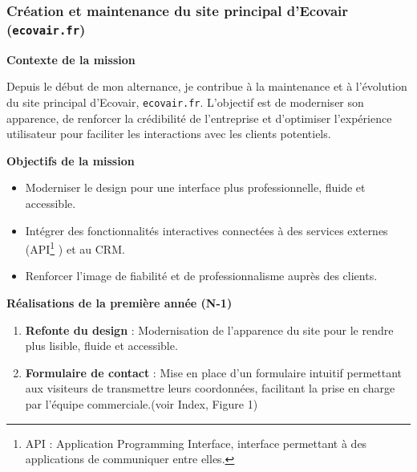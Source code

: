 \subsubsection{Création et maintenance du site principal d’Ecovair (\texttt{ecovair.fr})}

\textbf{Contexte de la mission}\vspace{0.3cm}

Depuis le début de mon alternance, je contribue à la maintenance et à l’évolution du site principal d’Ecovair, \texttt{ecovair.fr}. L’objectif est de moderniser son apparence, de renforcer la crédibilité de l’entreprise et d’optimiser l’expérience utilisateur pour faciliter les interactions avec les clients potentiels.\vspace{0.3cm}

\textbf{Objectifs de la mission}\vspace{0.3cm}

\begin{itemize}
    \item Moderniser le design pour une interface plus professionnelle, fluide et accessible.\vspace{0.3cm}
    \item Intégrer des fonctionnalités interactives connectées à des services externes (API\footnote{API : Application Programming Interface, interface permettant à des applications de communiquer entre elles.}
) et au CRM.\vspace{0.3cm}
    \item Renforcer l’image de fiabilité et de professionnalisme auprès des clients.\vspace{0.3cm}
\end{itemize}

\textbf{Réalisations de la première année (N-1)}\vspace{0.3cm}

\begin{enumerate}
    \item \textbf{Refonte du design} : Modernisation de l’apparence du site pour le rendre plus lisible, fluide et accessible.\vspace{0.3cm}
    \item \textbf{Formulaire de contact} : Mise en place d’un formulaire intuitif permettant aux visiteurs de transmettre leurs coordonnées, facilitant la prise en charge par l’équipe commerciale.(voir Index, Figure 1)\vspace{0.3cm}
\end{enumerate}

